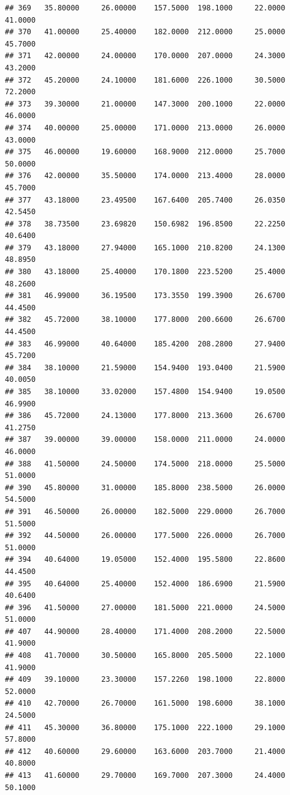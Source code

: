\documentclass[]{article}
\begin{document}
\begin{verbatim}
## 369   35.80000     26.00000    157.5000  198.1000     22.0000       41.0000
## 370   41.00000     25.40000    182.0000  212.0000     25.0000       45.7000
## 371   42.00000     24.00000    170.0000  207.0000     24.3000       43.2000
## 372   45.20000     24.10000    181.6000  226.1000     30.5000       72.2000
## 373   39.30000     21.00000    147.3000  200.1000     22.0000       46.0000
## 374   40.00000     25.00000    171.0000  213.0000     26.0000       43.0000
## 375   46.00000     19.60000    168.9000  212.0000     25.7000       50.0000
## 376   42.00000     35.50000    174.0000  213.4000     28.0000       45.7000
## 377   43.18000     23.49500    167.6400  205.7400     26.0350       42.5450
## 378   38.73500     23.69820    150.6982  196.8500     22.2250       40.6400
## 379   43.18000     27.94000    165.1000  210.8200     24.1300       48.8950
## 380   43.18000     25.40000    170.1800  223.5200     25.4000       48.2600
## 381   46.99000     36.19500    173.3550  199.3900     26.6700       44.4500
## 382   45.72000     38.10000    177.8000  200.6600     26.6700       44.4500
## 383   46.99000     40.64000    185.4200  208.2800     27.9400       45.7200
## 384   38.10000     21.59000    154.9400  193.0400     21.5900       40.0050
## 385   38.10000     33.02000    157.4800  154.9400     19.0500       46.9900
## 386   45.72000     24.13000    177.8000  213.3600     26.6700       41.2750
## 387   39.00000     39.00000    158.0000  211.0000     24.0000       46.0000
## 388   41.50000     24.50000    174.5000  218.0000     25.5000       51.0000
## 390   45.80000     31.00000    185.8000  238.5000     26.0000       54.5000
## 391   46.50000     26.00000    182.5000  229.0000     26.7000       51.5000
## 392   44.50000     26.00000    177.5000  226.0000     26.7000       51.0000
## 394   40.64000     19.05000    152.4000  195.5800     22.8600       44.4500
## 395   40.64000     25.40000    152.4000  186.6900     21.5900       40.6400
## 396   41.50000     27.00000    181.5000  221.0000     24.5000       51.0000
## 407   44.90000     28.40000    171.4000  208.2000     22.5000       41.9000
## 408   41.70000     30.50000    165.8000  205.5000     22.1000       41.9000
## 409   39.10000     23.30000    157.2260  198.1000     22.8000       52.0000
## 410   42.70000     26.70000    161.5000  198.6000     38.1000       24.5000
## 411   45.30000     36.80000    175.1000  222.1000     29.1000       57.8000
## 412   40.60000     29.60000    163.6000  203.7000     21.4000       40.8000
## 413   41.60000     29.70000    169.7000  207.3000     24.4000       50.1000

\end{verbatim}
\end{document}
